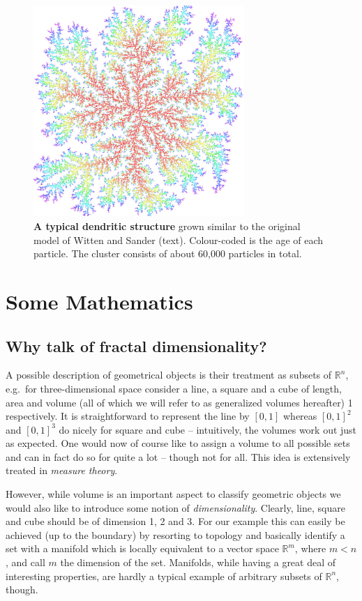 \documentclass[twocolumn, 10pt]{scrartcl}
\begin{document}
        \begin{figure}
            \center
            \includegraphics[width=8cm]{img/wsdendrite.jpg}
            \caption[A typical dendritic structure]
                {\small\textbf{A typical dendritic structure} grown similar to the original model of Witten
                and Sander (text). Colour-coded is the age of each particle. The cluster consists of about
                60,000 particles in total.}
            \label{fig-wsdendrite}
        \end{figure}

    \section{Some Mathematics}
        \subsection{Why talk of fractal dimensionality?}
            A possible description of geometrical objects is their treatment as subsets of $\mathbb{R}^n$, e.g.\ for
            three-dimensional space consider a line, a square and a cube of length, area and volume (all of which we
            will refer to as generalized volumes hereafter) 1 respectively. It is straightforward to represent the line
            by $\left[0,1\right]$ whereas $\left[0,1\right]^2$ and $\left[0,1\right]^3$ do nicely for square and cube
            -- intuitively, the volumes work out just as expected. One would now of course like to assign a 
            volume to all possible sets and can in fact do so for quite a lot -- though not for all. This idea is
            extensively treated in \emph{measure theory}.
            
            However, while volume is an important aspect to classify geometric objects we would also like to
            introduce some notion of \emph{dimensionality}. Clearly, line, square and cube should be of dimension 1, 2
            and 3. For our example this can easily be achieved (up to the boundary) by resorting to topology and
            basically identify a set with a manifold which is locally equivalent to a vector space
            $\mathbb{R}^m$, where $m<n$, and call $m$ the dimension of the set. Manifolds, while having a great deal
            of interesting properties, are hardly a typical example of arbitrary subsets of $\mathbb{R}^n$, though.
            
\end{document}
